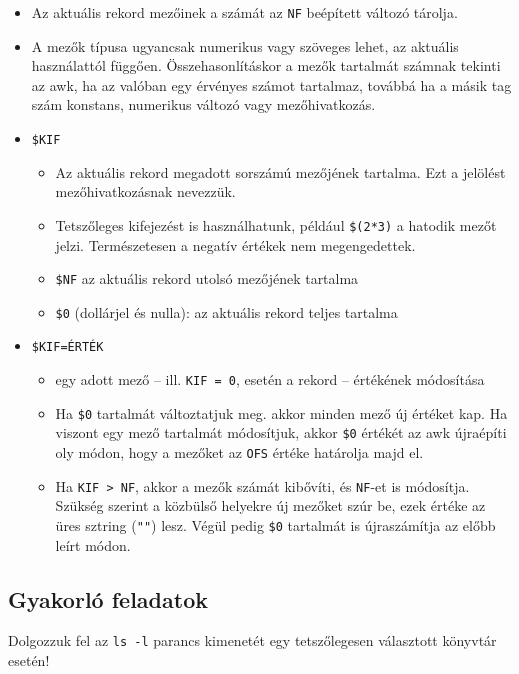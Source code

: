 \begin{itemize} 
\item  Az aktuális rekord mezőinek a számát az \texttt{NF} beépített változó tárolja.
\item  A mezők típusa ugyancsak numerikus vagy szöveges lehet, az aktuális használattól függően. Összehasonlításkor a mezők tartalmát számnak tekinti az awk, ha az valóban egy érvényes számot tartalmaz, továbbá ha a másik tag szám konstans, numerikus változó vagy mezőhivatkozás.
\item \verb.$KIF.\hfill
	\begin{itemize}
	\item  Az aktuális rekord megadott sorszámú mezőjének tartalma. Ezt a jelölést mezőhivatkozásnak nevezzük.
	\item  Tetszőleges kifejezést is használhatunk, például \verb.$(2*3). a hatodik mezőt jelzi. 
			Természetesen a negatív értékek nem megengedettek.
	\item  \verb.$NF. az aktuális rekord utolsó mezőjének tartalma
	\item  \verb.$0. (dollárjel és nulla): az aktuális rekord teljes tartalma
	\end{itemize}
\item  \verb.$KIF=ÉRTÉK.\hfill
	\begin{itemize}
	\item egy adott mező – ill. \verb.KIF = 0., esetén a rekord – értékének módosítása
	\item Ha \verb.$0. tartalmát változtatjuk meg. akkor minden mező új értéket kap.
	Ha viszont egy mező tartalmát módosítjuk, akkor \verb.$0. értékét az awk
		újraépíti oly módon, hogy a mezőket az \texttt{OFS} értéke határolja majd el.
	\item Ha \texttt{KIF > NF}, akkor a mezők számát kibővíti, és \texttt{NF}-et is módosítja.
	Szükség szerint a közbülső helyekre új mezőket szúr be, ezek értéke az
		üres sztring (\verb."".) lesz. Végül pedig \verb.$0. tartalmát is újraszámítja az előbb leírt módon.
	\end{itemize}
\end{itemize}



\subsection*{Gyakorló feladatok}
Dolgozzuk fel az \texttt{ls -l} parancs kimenetét egy tetszőlegesen választott könyvtár esetén!

